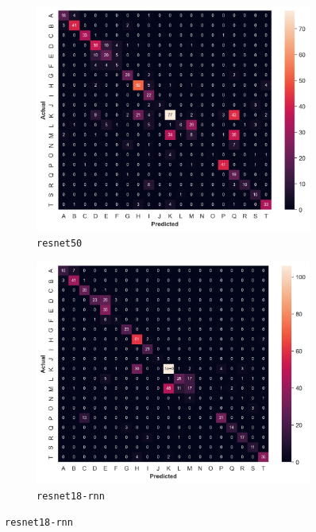 \documentclass[a4paper]{article}
\begin{document}
\begin{figure}[b]
\begin{subfigure}{.33\textwidth}
    \end{subfigure}
    \begin{subfigure}{.33\textwidth}
        \centering
        \includegraphics[width=\textwidth]
        {figures/experiment1-conf-matrix-resnet50.png}
        \caption{\texttt{resnet50}}
    \end{subfigure}%
    \begin{subfigure}{.33\textwidth}
        \centering
        \includegraphics[width=\textwidth]
        {figures/experiment1-conf-matrix-resnet18-rnn.png}
        \caption{\texttt{resnet18-rnn}}

\end{subfigure}
\end{figure}
\end{document}
